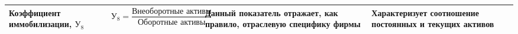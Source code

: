 \begin{longtable}{|l|l|l|l|}
		\parbox[c]{3cm}{Коэффициент иммобилизации, $ \text{У}_8 $}&   $ \text{У}_8 = \dfrac{\text{Внеоборотные активы}}{\text{Оборотные активы}}     $ &     Данный показатель отражает, как правило, отраслевую специфику фирмы  & Характеризует соотношение постоянных и  текущих активов     \\ \hline
	\end{longtable}




